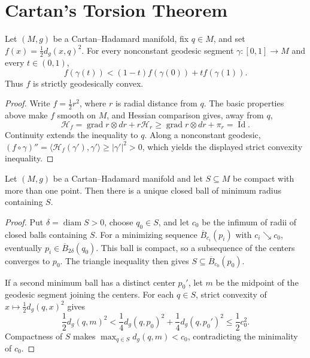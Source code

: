 \section*{Cartan's Torsion Theorem}

\begin{lemma}
\label{lem:geodesic-convexity-distance-squared}

Let $(M,g)$ be a Cartan--Hadamard manifold, fix $q\in M$, and set
$f(x)=\frac12d_g(x,q)^2$.  For every nonconstant geodesic segment
$\gamma:[0,1]\to M$ and every $t\in(0,1)$,
\begin{equation}
f(\gamma(t))<(1-t)f(\gamma(0))+tf(\gamma(1)). \tag{12.1}
\end{equation}
Thus $f$ is strictly geodesically convex.
\begin{proof}
\sketch Write $f=\frac12r^2$, where $r$ is radial distance from $q$.
The basic properties above make $f$ smooth on $M$, and Hessian comparison
gives, away from $q$,
\[
\mathcal H_f=\operatorname{grad}r\otimes dr+r\mathcal H_r
\geq\operatorname{grad}r\otimes dr+\pi_r=\operatorname{Id}.
\]
Continuity extends the inequality to $q$.  Along a nonconstant geodesic,
$(f\circ\gamma)''=\langle\mathcal H_f(\gamma'),\gamma'\rangle
\geq|\gamma'|^2>0$, which yields the displayed strict convexity inequality.
\end{proof}
\end{lemma}

\begin{lemma}
\label{lem:unique-minimal-enclosing-ball}

Let $(M,g)$ be a Cartan--Hadamard manifold and let $S\subseteq M$ be compact
with more than one point.  Then there is a unique closed ball of minimum
radius containing $S$.
\begin{proof}
\sketch Put $\delta=\operatorname{diam}S>0$, choose $q_0\in S$, and let $c_0$
be the infimum of radii of closed balls containing $S$.  For a minimizing
sequence $\overline B_{c_i}(p_i)$ with $c_i\searrow c_0$, eventually
$p_i\in\overline B_{2\delta}(q_0)$.  This ball is compact, so a subsequence of
the centers converges to $p_0$.  The triangle inequality then gives
$S\subseteq\overline B_{c_0}(p_0)$.

If a second minimum ball has a distinct center $p_0'$, let $m$ be the midpoint
of the geodesic segment joining the centers.  For each $q\in S$, strict
convexity of $x\mapsto\frac12d_g(q,x)^2$ gives
\[
\frac12d_g(q,m)^2<\frac14d_g(q,p_0)^2+
\frac14d_g(q,p_0')^2\leq\frac12c_0^2.
\]
Compactness of $S$ makes $\max_{q\in S}d_g(q,m)<c_0$, contradicting the
minimality of $c_0$.
\end{proof}
\end{lemma}

